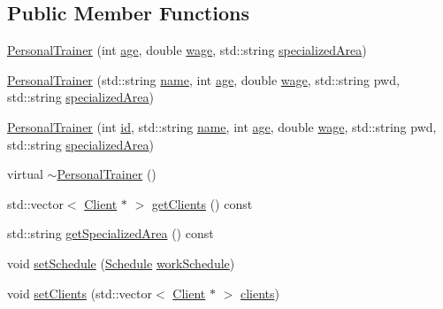 \subsection*{Public Member Functions}
\begin{DoxyCompactItemize}
\item 
\hyperlink{classPersonalTrainer_ae327bfc36d13d337e1b4b8771f91fe1a}{Personal\+Trainer} (int \hyperlink{classStaff_ab36cd34fc6aa9c62ed9ca72263fd0ccc}{age}, double \hyperlink{classStaff_af84be4072f59d7c5c15d7c9cc07ea002}{wage}, std\+::string \hyperlink{classPersonalTrainer_aed2a4e21367c2cdd67aecba26924e17c}{specialized\+Area})
\item 
\hyperlink{classPersonalTrainer_a650aa788b90d10003feaf69e0d948fdf}{Personal\+Trainer} (std\+::string \hyperlink{classStaff_ad0e56a6c5296a2138aed86dc0cf476cb}{name}, int \hyperlink{classStaff_ab36cd34fc6aa9c62ed9ca72263fd0ccc}{age}, double \hyperlink{classStaff_af84be4072f59d7c5c15d7c9cc07ea002}{wage}, std\+::string pwd, std\+::string \hyperlink{classPersonalTrainer_aed2a4e21367c2cdd67aecba26924e17c}{specialized\+Area})
\item 
\hyperlink{classPersonalTrainer_ad3604f25652db9ee06b6bcd5c7790de6}{Personal\+Trainer} (int \hyperlink{classStaff_a2b5674cabb4b4e3a50cd130898d00c20}{id}, std\+::string \hyperlink{classStaff_ad0e56a6c5296a2138aed86dc0cf476cb}{name}, int \hyperlink{classStaff_ab36cd34fc6aa9c62ed9ca72263fd0ccc}{age}, double \hyperlink{classStaff_af84be4072f59d7c5c15d7c9cc07ea002}{wage}, std\+::string pwd, std\+::string \hyperlink{classPersonalTrainer_aed2a4e21367c2cdd67aecba26924e17c}{specialized\+Area})
\item 
virtual \hyperlink{classPersonalTrainer_ac6168e15ba23da6fae865ed923967fdd}{$\sim$\+Personal\+Trainer} ()
\item 
std\+::vector$<$ \hyperlink{classClient}{Client} $\ast$ $>$ \hyperlink{classPersonalTrainer_ad2f3a57cc4caabc6a1111f32615708a4}{get\+Clients} () const 
\item 
std\+::string \hyperlink{classPersonalTrainer_af83723e922ded3048beb9a9b3c329520}{get\+Specialized\+Area} () const 
\item 
void \hyperlink{classPersonalTrainer_a85af429825b072bbde67be03c47f604e}{set\+Schedule} (\hyperlink{classSchedule}{Schedule} \hyperlink{classStaff_ac2864b27c3cf1383c39916077b64b229}{work\+Schedule})
\item 
void \hyperlink{classPersonalTrainer_aef8f15c84017844ae7e2f38d072b9623}{set\+Clients} (std\+::vector$<$ \hyperlink{classClient}{Client} $\ast$ $>$ \hyperlink{classPersonalTrainer_a6317476679a0c3365fb02632f1af2aae}{clients})

\end{DoxyCompactItemize}

